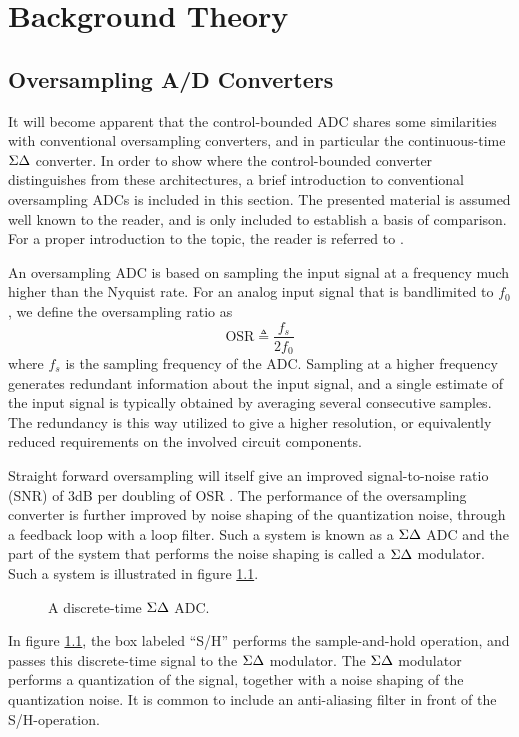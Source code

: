 
\chapter{Background Theory}
\label{sec:theory}
\section{Oversampling A/D Converters}
It will become apparent that the control-bounded ADC shares some similarities with conventional oversampling converters, and in particular the continuous-time $\Sigma\Delta$ converter. In order to show where the control-bounded converter distinguishes from these architectures, a brief introduction to conventional oversampling ADCs is included in this section. The presented material is assumed well known to the reader, and is only included to establish a basis of comparison. For a proper introduction to the topic, the reader is referred to \cite{johns_martin}.

An oversampling ADC is based on sampling the input signal at a frequency much higher than the Nyquist rate. For an analog input signal that is bandlimited to $f_0$, we define the oversampling ratio as
\begin{equation}
    \text{OSR} \triangleq \frac{f_s}{2f_0}
\end{equation}
where $f_s$ is the sampling frequency of the ADC. Sampling at a higher frequency generates redundant information about the input signal, and a single estimate of the input signal is typically obtained by averaging several consecutive samples. The redundancy is this way utilized to give a higher resolution, or equivalently reduced requirements on the involved circuit components.

Straight forward oversampling will itself give an improved signal-to-noise ratio (SNR) of 3dB per doubling of OSR \cite{johns_martin}. The performance of the oversampling converter is further improved by noise shaping of the quantization noise, through a feedback loop with a loop filter. Such a system is known as a $\Sigma\Delta$ ADC and the part of the system that performs the noise shaping is called a $\Sigma\Delta$ modulator. Such a system is illustrated in figure \ref{fig:dtsdmod}.
\begin{figure}[htbp]
    
    \centering
    \caption{A discrete-time $\Sigma\Delta$ ADC.}
    \label{fig:dtsdmod}
\end{figure}
In figure \ref{fig:dtsdmod}, the box labeled \enquote{S/H} performs the sample-and-hold operation, and passes this discrete-time signal to the $\Sigma\Delta$ modulator. The $\Sigma\Delta$ modulator performs a quantization of the signal, together with a noise shaping of the quantization noise. It is common to include an anti-aliasing filter in front of the S/H-operation.


